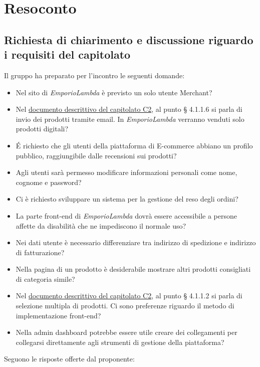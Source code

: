 \section{Resoconto}
\subsection{Richiesta di chiarimento e discussione riguardo i requisiti del capitolato}
Il gruppo ha preparato per l'incontro le seguenti domande:
\begin{itemize}
\item Nel sito di \textit{EmporioLambda} è previsto un solo utente Merchant?
\item Nel \href{https://www.math.unipd.it/~tullio/IS-1/2020/Progetto/C2.pdf}{documento descrittivo del capitolato C2}, al punto § 4.1.1.6 si parla di invio dei prodotti tramite email. In \textit{EmporioLambda} verranno venduti solo prodotti digitali?
\item É richiesto che gli utenti della piattaforma di E-commerce abbiano un profilo pubblico, raggiungibile dalle recensioni sui prodotti?
\item Agli utenti sarà permesso modificare informazioni personali come nome, cognome e password?
\item Ci è richiesto sviluppare un sistema per la gestione del reso degli ordini?
\item La parte front-end di \textit{EmporioLambda} dovrà essere accessibile a persone affette da disabilità che ne impediscono il normale uso?
\item Nei dati utente è necessario differenziare tra indirizzo di spedizione e indirizzo di fatturazione?
\item Nella pagina di un prodotto è desiderabile mostrare altri prodotti consigliati di categoria simile?
\item Nel \href{https://www.math.unipd.it/~tullio/IS-1/2020/Progetto/C2.pdf}{documento descrittivo del capitolato C2}, al punto § 4.1.1.2 si parla di selezione multipla di prodotti. Ci sono preferenze riguardo il metodo di implementazione front-end?
\item Nella admin dashboard potrebbe essere utile creare dei collegamenti per collegarsi direttamente agli strumenti di gestione della piattaforma?
\end{itemize}
Seguono le risposte offerte dal proponente:
